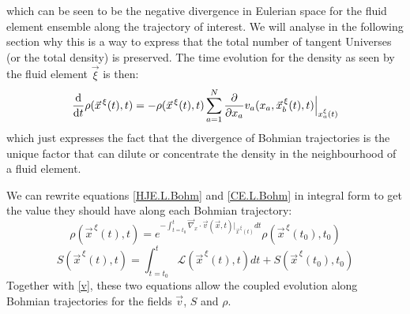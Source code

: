 \documentclass[11pt, a4paper]{article} %
\newcommand{\Lg}{\mathscr{L}}
\begin{document}
which can be seen to be the negative divergence in Eulerian space for the fluid element ensemble along the trajectory of interest. We will analyse in the following section why this is a way to express that the total number of tangent Universes (or the total density) is preserved. The time evolution for the density as seen by the fluid element $\vec{\xi}$ is then:
\begin{equation}\label{CE.L.Bohm}
\dv{}{t}\rho(\vec{x}^{\, \xi}(t),t)=-\rho(\vec{x}^{\, \xi}(t),t)\sum_{a=1}^N\pdv{}{x_a} v_a(x_a, \vec{x}_b^{\, \xi}(t),t)\Big\rvert_{x_a^\xi(t)}
\end{equation}
which just expresses the fact that the divergence of Bohmian trajectories is the unique factor that can dilute or concentrate the density in the neighbourhood of a fluid element.

We can rewrite equations \eqref{HJE.L.Bohm} and \eqref{CE.L.Bohm} in integral form to get the value they should have along each Bohmian trajectory:
\begin{equation}\label{JacPre.Bohm}
\rho(\vec{x}^{\, \xi}(t),t)=e^{-\int_{t=t_0}^t \vec{\nabla}_x\cdot \vec{v}(\vec{x},t)\rvert_{\vec{x}^{\, \xi}(t)} dt}\rho(\vec{x}^{\, \xi}(t_0),t_0)
\end{equation}
\begin{equation}\label{ActPre.Bohm}
S(\vec{x}^{\, \xi}(t),t)=\int_{t=t_0}^t \Lg(\vec{x}^{\, \xi}(t),t) dt+S(\vec{x}^{\, \xi}(t_0),t_0)
\end{equation}
Together with \eqref{v}, these two equations allow the coupled evolution along Bohmian trajectories for the fields $\vec{v}$, $S$ and $\rho$. 
\end{document}
